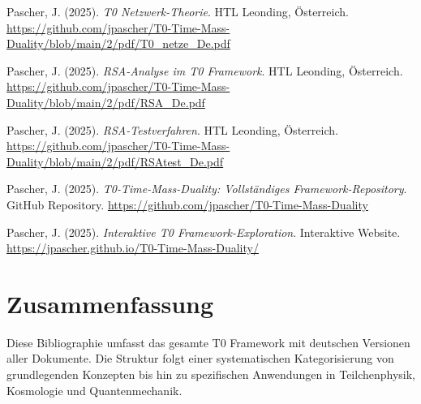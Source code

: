 \documentclass{article}
\begin{document}
\begin{thebibliography}{99}
		Pascher, J. (2025).
		\textit{T0 Netzwerk-Theorie}.
		HTL Leonding, Österreich.
		\url{https://github.com/jpascher/T0-Time-Mass-Duality/blob/main/2/pdf/T0_netze_De.pdf}
		
		
		Pascher, J. (2025).
		\textit{RSA-Analyse im T0 Framework}.
		HTL Leonding, Österreich.
		\url{https://github.com/jpascher/T0-Time-Mass-Duality/blob/main/2/pdf/RSA_De.pdf}
		
		Pascher, J. (2025).
		\textit{RSA-Testverfahren}.
		HTL Leonding, Österreich.
		\url{https://github.com/jpascher/T0-Time-Mass-Duality/blob/main/2/pdf/RSAtest_De.pdf}
		
		
		Pascher, J. (2025).
		\textit{T0-Time-Mass-Duality: Vollständiges Framework-Repository}.
		GitHub Repository.
		\url{https://github.com/jpascher/T0-Time-Mass-Duality}
		
		Pascher, J. (2025).
		\textit{Interaktive T0 Framework-Exploration}.
		Interaktive Website.
		\url{https://jpascher.github.io/T0-Time-Mass-Duality/}
		
	\end{thebibliography}
	
	\section{Zusammenfassung}
	Diese Bibliographie umfasst das gesamte T0 Framework mit deutschen Versionen aller Dokumente. Die Struktur folgt einer systematischen Kategorisierung von grundlegenden Konzepten bis hin zu spezifischen Anwendungen in Teilchenphysik, Kosmologie und Quantenmechanik.
	
\end{document}
